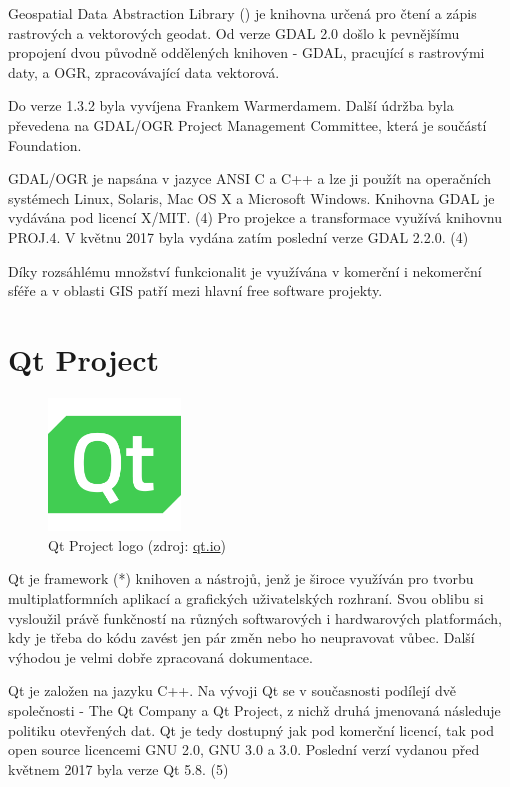 Geospatial Data Abstraction Library () je knihovna určená pro čtení a zápis rastrových a vektorových geodat. Od verze GDAL 2.0 došlo k pevnějšímu propojení dvou původně oddělených knihoven - GDAL, pracující s rastrovými daty, a OGR, zpracovávající data vektorová.

Do verze 1.3.2 byla vyvíjena Frankem Warmerdamem. Další údržba byla převedena na GDAL/OGR Project Management Committee, která je součástí  Foundation. 

GDAL/OGR je napsána v jazyce ANSI C a C++ a lze ji použít na operačních systémech Linux, Solaris, Mac OS X a Microsoft Windows. Knihovna GDAL je vydávána pod licencí X/MIT. (4) Pro projekce a transformace využívá knihovnu PROJ.4. V květnu 2017 byla vydána zatím poslední verze GDAL 2.2.0. (4)

Díky rozsáhlému množství funkcionalit je využívána v komerční i nekomerční sféře a v oblasti GIS patří mezi hlavní free software projekty.


\section{Qt Project}

\begin{figure}[H]
    \centering
      \includegraphics[width=100pt]{./pictures/qt_logo_green_256x256px.png}
      \caption[Qt Project logo]{Qt Project logo 
      (zdroj: \href{http://brand.qt.io/downloads/}{qt.io})}
      \label{fig:qt}
  \end{figure}

Qt je framework (*) knihoven a nástrojů, jenž je široce využíván pro tvorbu multiplatformních aplikací a grafických uživatelských rozhraní. Svou oblibu si vysloužil právě funkčností na různých softwarových i hardwarových platformách, kdy je třeba do kódu zavést jen pár změn nebo ho neupravovat vůbec. Další výhodou je velmi dobře zpracovaná dokumentace.

Qt je založen na jazyku C++. Na vývoji Qt se v současnosti podílejí dvě společnosti - The Qt Company a Qt Project, z nichž druhá jmenovaná následuje politiku otevřených dat. Qt je tedy dostupný jak pod komerční licencí, tak pod open source licencemi GNU  2.0, GNU  3.0 a  3.0. Poslední verzí vydanou před květnem 2017 byla verze Qt 5.8. (5)


